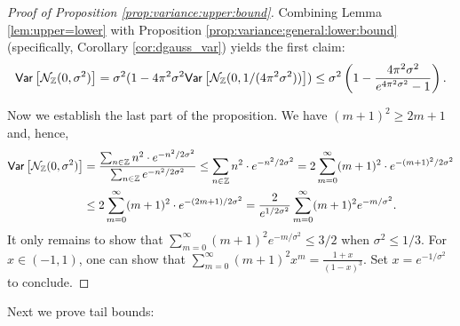 \documentclass{jpcfinal} %
\newcommand{\var}[2]{{\ifx&#1& \mathsf{Var} \else
\underset{#1}{\mathsf{Var}} \fi \left[#2\right]}}
\newcommand{\Z}{\mathbb{Z}}
\begin{document}
\begin{proof}[Proof of Proposition \ref{prop:variance:upper:bound}]
Combining Lemma \ref{lem:upper=lower} with Proposition \ref{prop:variance:general:lower:bound} (specifically, Corollary \ref{cor:dgauss_var}) yields the first claim:
\[
\var{}{\discN(0,\sigma^2)} = \sigma^2 (1 - 4\pi^2\sigma^2\var{}{\discN(0,1/(4\pi^2\sigma^2))} ) \leq \sigma^2 \left(1 - \frac{4\pi^2\sigma^2}{e^{4\pi^2\sigma^2}-1} \right).
\]

Now we establish the last part of the proposition. We have $(m+1)^2\ge 2m+1$ and, hence,
\begin{align*}
    \var{}{\discN(0,\sigma^2)} &= \frac{\sum_{n \in \Z} n^2 \cdot e^{-n^2/2\sigma^2}}{\sum_{n \in \Z} e^{-n^2/2\sigma^2}} \le \sum_{n \in \Z} n^2 \cdot e^{-n^2/2\sigma^2} = 2\sum_{m=0}^\infty (m+1)^2 \cdot e^{-(m+1)^2/2\sigma^2}\\
    &\le 2\sum_{m=0}^\infty (m+1)^2 \cdot e^{-(2m+1)/2\sigma^2} = \frac{2}{e^{1/2\sigma^2}} \sum_{m=0}^\infty (m+1)^2 e^{-m/\sigma^2}.
\end{align*}
It only remains to show that $\sum_{m=0}^\infty (m+1)^2 e^{-m/\sigma^2} \leq 3/2$ when $\sigma^2\le1/3$. For $x \in (-1,1)$, one can show that $\sum_{m=0}^\infty (m+1)^2 x^{m} = \frac{1+x}{(1-x)^3}$. Set $x=e^{-1/\sigma^2}$ to conclude.
\end{proof}

Next we prove tail bounds:
\end{document}

